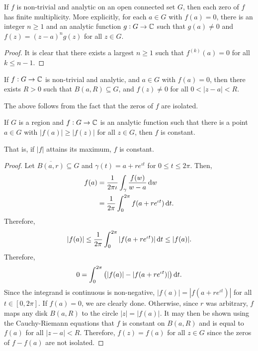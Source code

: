 	\begin{corollary}
		If $f$ is non-trivial and analytic on an open connected set $G$, then each zero of $f$ has finite multiplicity. More explicitly, for each $a \in G$ with $f(a) = 0$, there is an integer $n \ge 1$ and an analytic function $g : G \to \mathbb{C}$ such that $g(a) \ne 0$ and $f(z) = (z-a)^n g(z)$ for all $z \in G$.
	\end{corollary}
	\begin{proof}
		It is clear that there exists a largest $n \ge 1$ such that $f^{(k)}(a) = 0$ for all $k \le n-1$.
	\end{proof}

	\begin{corollary}
		If $f : G \to \mathbb{C}$ is non-trivial and analytic, and $a \in G$ with $f(a) = 0$, then there exists $R > 0$ such that $B(a,R) \subseteq G$, and $f(z) \ne 0$ for all $0 < |z-a| < R$. 
	\end{corollary}
	The above follows from the fact that the zeros of $f$ are isolated.

	\begin{ftheo}
		\label{theo: maximum modulus theorem}
		If $G$ is a region and $f:G\to\mathbb{C}$ is an analytic function such that there is a point $a\in G$ with $|f(a)| \ge |f(z)|$ for all $z \in G$, then $f$ is constant.
	\end{ftheo}
	That is, if $|f|$ attains its maximum, $f$ is constant.
	\begin{proof}
		Let $\overline{B(a,r)} \subseteq G$ and $\gamma(t) = a + re^{\iota t}$ for $0 \le t \le 2\pi$. Then,
		\begin{align*}
			f(a) &= \frac{1}{2\pi\iota} \int_\gamma \frac{f(w)}{w-a} \dif w \\
				&= \frac{1}{2\pi} \int_0^{2\pi} f(a + re^{\iota t}) \dif t.
		\end{align*}
		Therefore,
		\[ |f(a)| \le \frac{1}{2\pi} \int_0^{2\pi} |f(a+re^{\iota t})| \dif t \le |f(a)|. \]
		Therefore,
		\[ 0 = \int_0^{2\pi} \left( |f(a)| - |f(a+re^{\iota t})| \right) \dif t. \]
		Since the integrand is continuous is non-negative, $|f(a)| = |f(a+re^{\iota t})|$ for all $t \in [0,2\pi]$. If $f(a) = 0$, we are clearly done. Otherwise, since $r$ was arbitrary, $f$ maps any disk $B(a,R)$ to the circle $|z| = |f(a)|$. It may then be shown using the Cauchy-Riemann equations that $f$ is constant on $B(a,R)$ and is equal to $f(a)$ for all $|z-a| < R$. Therefore, $f(z) = f(a)$ for all $z \in G$ since the zeros of $f-f(a)$ are not isolated.
	\end{proof}

